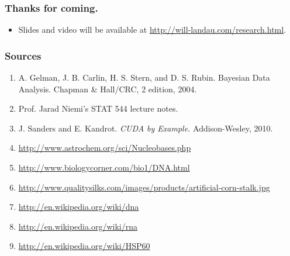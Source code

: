 \documentclass[handout]{beamer}
\numberwithin{equation}{section}
\begin{document}
\begin{frame}
\frametitle{Thanks for coming.}
\begin{itemize}
\item Slides and video will be available at \url{http://will-landau.com/research.html}.
\end{itemize}
\end{frame}

\begin{frame}
\frametitle{Sources}
\begin{enumerate}[1. ]
\item A. Gelman, J. B. Carlin, H. S. Stern, and D. S. Rubin. Bayesian Data Analysis. Chapman \& Hall/CRC, 2 edition, 2004.
\item Prof. Jarad Niemi's STAT 544 lecture notes.
\item J. Sanders and E. Kandrot. \emph{CUDA by Example.} Addison-Wesley, 2010.
\item \url{http://www.astrochem.org/sci/Nucleobases.php}
\item \url{http://www.biologycorner.com/bio1/DNA.html}
\item \url{http://www.qualitysilks.com/images/products/artificial-corn-stalk.jpg}
\item \url{http://en.wikipedia.org/wiki/dna}
\item \url{http://en.wikipedia.org/wiki/rna}
\item \url{http://en.wikipedia.org/wiki/HSP60}
\end{enumerate}
\end{frame}
\end{document}
